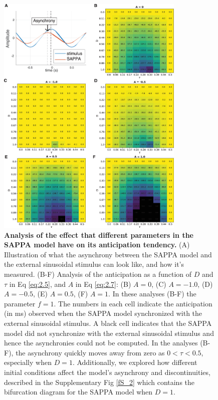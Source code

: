 \documentclass{report}
\begin{document}
\begin{figure}
    \centering
    \includegraphics[width=0.8\textwidth]{figures/fig2_6.png}
    \caption[Analysis of the effect that different parameters in the SAPPA model have on its anticipation tendency]{\textbf{Analysis of the effect that different parameters in the SAPPA model have on its anticipation tendency.} (A) Illustration of what the asynchrony between the SAPPA model and the external sinusoidal stimulus can look like, and how it's measured. (B-F) Analysis of the anticipation as a function of $D$ and $\tau$ in Eq \eqref{eq:2.5}, and $A$ in Eq \eqref{eq:2.7}: (B) $A = 0$, (C) $A = -1.0$, (D) $A = -0.5$, (E) $A = 0.5$, (F) $A = 1$. In these analyses (B-F) the parameter $f = 1$. The numbers in each cell indicate the anticipation (in ms) observed when the SAPPA model synchronized with the external sinusoidal stimulus. A black cell indicates that the SAPPA model did not synchronize with the external sinusoidal stimulus and hence the asynchronies could not be computed. In the analyses (B-F), the asynchrony quickly moves away from zero as $0 < \tau < 0.5$, especially when $D = 1$. Additionally, we explored how different initial conditions affect the model's asynchrony and discontinuities, described in the Supplementary Fig \ref{fS_2} which contains the bifurcation diagram for the SAPPA model when $D = 1$.} 
    \label{f2_6}
\end{figure}
\end{document}
